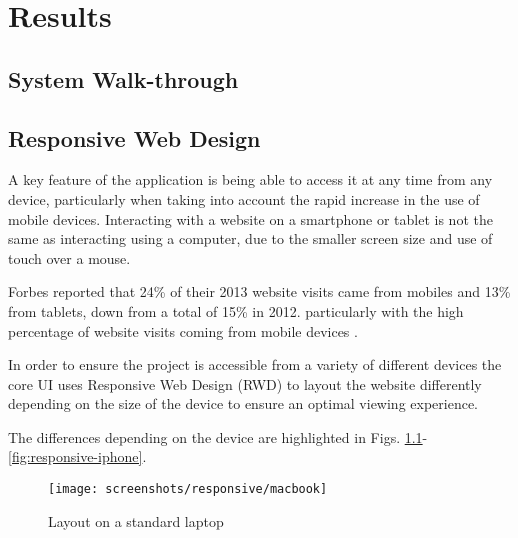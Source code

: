 \chapter{Results}

\begin{comment}
Chapter 5: Results
Results that illustrate how the system designed by you works in practice, and how it is intended to be used, may be presented in this chapter. Screen shots may be useful to illustrate how the software interacts with the user.
\end{comment}


\section{System Walk-through}

\section{Responsive Web Design}

A key feature of the application is being able to access it at any time from any device, particularly when taking into account the rapid increase in the use of mobile devices.  Interacting with a website on a smartphone or tablet is not the same as interacting using a computer, due to the smaller screen size and use of touch over a mouse.

Forbes reported that 24\% of their 2013 website visits came from mobiles and 13\% from tablets, down from a total of 15\% in 2012. particularly with the high percentage of website visits coming from mobile devices \parencite{steimle2013responsive}.

In order to ensure the project is accessible from a variety of different devices the core UI uses Responsive Web Design (RWD) to layout the website differently depending on the size of the device to ensure an optimal viewing experience.

The differences depending on the device are highlighted in Figs. \ref{fig:responsive-macbook}-\ref{fig:responsive-iphone}.

\begin{figure}[h]
    \centering
    \texttt{[image: screenshots/responsive/macbook]}
    \caption{Layout on a standard laptop}
    \label{fig:responsive-macbook}
\end{figure}

